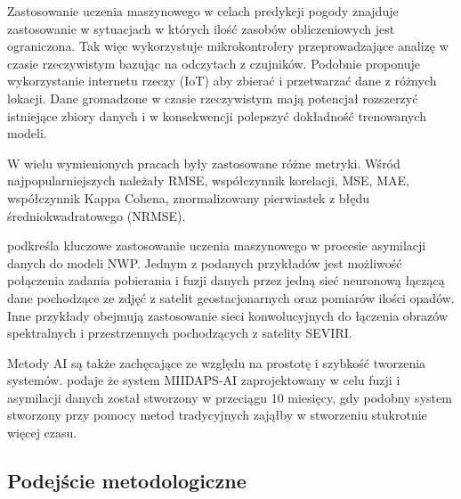 Zastosowanie uczenia maszynowego w celach predykcji pogody znajduje zastosowanie
w sytuacjach w których ilość zasobów obliczeniowych jest ograniczona. Tak więc
\cite{weather-forecasting-using-ml} wykorzystuje
mikrokontrolery przeprowadzające analizę w czasie rzeczywistym bazując na odczytach z 
czujników. Podobnie \cite{smart-weather-forecasting}
proponuje wykorzystanie internetu rzeczy (IoT) aby zbierać i przetwarzać dane z różnych lokacji.
Dane gromadzone w czasie rzeczywistym mają potencjał rozszerzyć istniejące zbiory danych
i w konsekwencji polepszyć dokładność trenowanych modeli.

W wielu wymienionych pracach \cite{development-and-application-of-ml-in}
były zastosowane różne metryki. Wśród najpopularniejszych
należały RMSE, współczynnik korelacji, MSE, MAE, współczynnik Kappa Cohena,
znormalizowany pierwiastek z błędu średniokwadratowego (NRMSE).

\cite{ai-revolutionises-weather-prediction}
podkreśla kluczowe zastosowanie uczenia maszynowego w procesie asymilacji danych do modeli NWP.
Jednym z podanych przykładów jest możliwość połączenia zadania pobierania i fuzji danych 
przez jedną sieć neuronową łączącą dane pochodzące ze zdjęć z satelit geostacjonarnych oraz 
pomiarów ilości opadów. Inne przykłady obejmują zastosowanie sieci konwolucyjnych do łączenia
obrazów spektralnych i przestrzennych pochodzących z satelity SEVIRI. 

Metody AI są także zachęcające ze względu na prostotę i szybkość tworzenia systemów.
\cite{ai-revolutionises-weather-prediction}
podaje że system MIIDAPS-AI zaprojektowany w celu fuzji i asymilacji danych został stworzony w
przeciągu 10 miesięcy, gdy podobny system stworzony przy pomocy metod tradycyjnych zająłby
w stworzeniu stukrotnie więcej czasu.

\subsection{Podejście metodologiczne}

